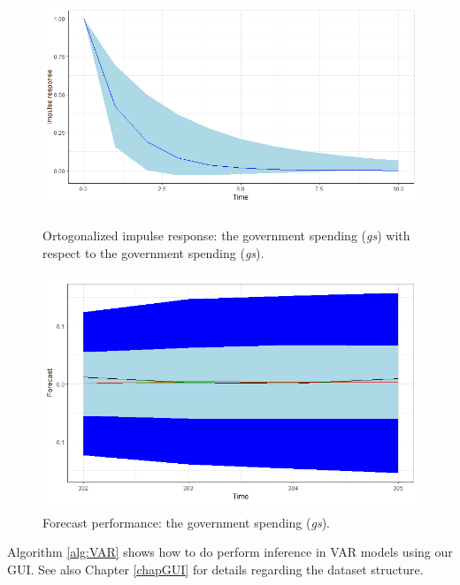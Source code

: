 \begin{figure}[!h]
	\includegraphics[width=340pt, height=200pt]{Chapters/chapter8/figures/IRsgsgO.png}
	\caption[List of figure caption goes here]{Ortogonalized impulse response: the government spending (\textit{gs}) with respect to the government spending (\textit{gs}).}\label{fig7}
\end{figure}

\begin{figure}[!h]
	\includegraphics[width=340pt, height=200pt]{Chapters/chapter8/figures/Forecastgs.png}
	\caption[List of figure caption goes here]{Forecast performance: the government spending (\textit{gs}).}\label{fig8}
\end{figure}

Algorithm \ref{alg:VAR} shows how to do perform inference in VAR models using our GUI. See also Chapter \ref{chapGUI} for details regarding the dataset structure. 

